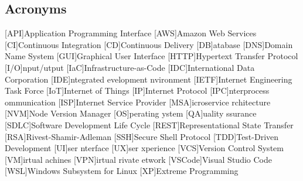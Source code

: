 \newcommand{\abbr}{Abbreviations}
\subsection{Acronyms}

\begin{acronym}[1234567890]		%
\setlength{\itemsep}{-\parsep}	%

[API]{Application Programming Interface}
[AWS]{Amazon Web Services}
[CI]{Continuous Integration}
[CD]{Continuous Delivery}
[DB]{atabase}
[DNS]{Domain Name System}
[GUI]{Graphical User Interface}
[HTTP]{Hypertext Transfer Protocol}
[I/O]{nput/utput}
[IaC]{Infrastructure-as-Code}
[IDC]{International Data Corporation}
[IDE]{ntegrated evelopment nvironment}
[IETF]{Internet Engineering Task Force}
[IoT]{Internet of Things}
[IP]{Internet Protocol}
[IPC]{nterprocess ommunication}
[ISP]{Internet Service Provider}
[MSA]{icroservice rchitecture}
[NVM]{Node Version Manager}
[OS]{perating ystem}
[QA]{uality ssurance}
[SDLC]{Software Development Life Cycle}
[REST]{Representational State Transfer}
[RSA]{Rivest-Shamir-Adleman}
[SSH]{Secure Shell Protocol}
[TDD]{Test-Driven Development}
[UI]{ser nterface}
[UX]{ser xperience}
[VCS]{Version Control System}
[VM]{irtual achines}
[VPN]{irtual rivate etwork}
[VSCode]{Visual Studio Code}
[WSL]{Windows Subsystem for Linux}
[XP]{Extreme Programming}
\end{acronym}
